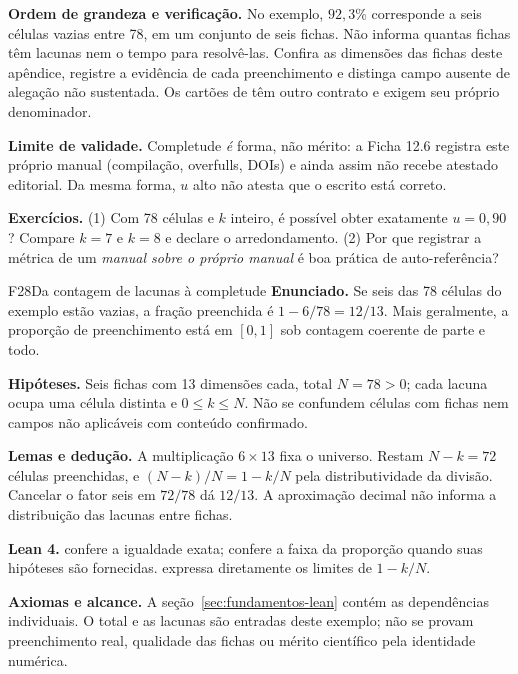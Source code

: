 \begin{resultado}
\textbf{Ordem de grandeza e verificação.} No exemplo, $92{,}3\%$ corresponde
a seis células vazias entre 78, em um conjunto de seis fichas. Não informa
quantas fichas têm lacunas nem o tempo para resolvê-las. Confira as dimensões
das fichas deste apêndice, registre a evidência de cada preenchimento e
distinga campo ausente de alegação não sustentada. Os cartões de
 têm outro contrato e exigem seu próprio denominador.
\end{resultado}

\begin{aviso}
\textbf{Limite de validade.} Completude \emph{é} forma, não mérito: a Ficha 12.6
registra este próprio manual (compilação, overfulls, DOIs) e ainda assim não
recebe atestado editorial. Da mesma forma, $u$ alto não atesta que o escrito está
correto.
\end{aviso}

\begin{resultado}
\textbf{Exercícios.} (1) Com 78 células e $k$ inteiro, é possível obter
exatamente $u=0{,}90$? Compare $k=7$ e $k=8$ e declare o arredondamento. (2) Por que
registrar a métrica de um \emph{manual sobre o próprio manual} é boa prática de
auto-referência?
\end{resultado}

\begin{formalizacao}{F28}{Da contagem de lacunas à completude}
\textbf{Enunciado.} Se seis das 78 células do exemplo estão vazias, a
fração preenchida é $1-6/78=12/13$. Mais geralmente, a proporção de
preenchimento está em $[0,1]$ sob contagem coerente de parte e todo.

\textbf{Hipóteses.} Seis fichas com 13 dimensões cada, total $N=78>0$;
cada lacuna ocupa uma célula distinta e $0\leq k\leq N$. Não se confundem
células com fichas nem campos não aplicáveis com conteúdo confirmado.

\textbf{Lemas e dedução.} A multiplicação $6\times13$ fixa o universo.
Restam $N-k=72$ células preenchidas, e
$(N-k)/N=1-k/N$ pela distributividade da divisão. Cancelar o fator seis
em $72/78$ dá $12/13$. A aproximação decimal não informa a distribuição
das lacunas entre fichas.

\textbf{Lean 4.} 
confere a igualdade exata; 
confere a faixa da proporção quando suas hipóteses são fornecidas.
 expressa diretamente
os limites de $1-k/N$.

\textbf{Axiomas e alcance.} A seção~\ref{sec:fundamentos-lean} contém
as dependências individuais. O total e as lacunas são entradas deste
exemplo; não se provam preenchimento real, qualidade das fichas ou mérito
científico pela identidade numérica.
\end{formalizacao}

